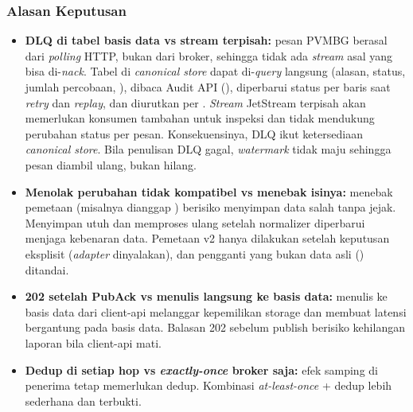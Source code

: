 \subsubsection{Alasan Keputusan}
\begin{itemize}
\item \textbf{DLQ di tabel basis data vs stream terpisah:} pesan PVMBG berasal dari \textit{polling} HTTP, bukan dari broker, sehingga tidak ada \textit{stream} asal yang bisa di-\textit{nack}. Tabel di \textit{canonical store} dapat di-\textit{query} langsung (alasan, status, jumlah percobaan, ), dibaca Audit API (), diperbarui status per baris saat \textit{retry} dan \textit{replay}, dan diurutkan per . \textit{Stream} JetStream terpisah akan memerlukan konsumen tambahan untuk inspeksi dan tidak mendukung perubahan status per pesan. Konsekuensinya, DLQ ikut ketersediaan \textit{canonical store}. Bila penulisan DLQ gagal, \textit{watermark} tidak maju sehingga pesan diambil ulang, bukan hilang.
\item \textbf{Menolak perubahan tidak kompatibel vs menebak isinya:} menebak pemetaan (misalnya  dianggap ) berisiko menyimpan data salah tanpa jejak. Menyimpan utuh dan memproses ulang setelah normalizer diperbarui menjaga kebenaran data. Pemetaan v2 hanya dilakukan setelah keputusan eksplisit (\textit{adapter} dinyalakan), dan pengganti yang bukan data asli () ditandai.
\item \textbf{202 setelah PubAck vs menulis langsung ke basis data:} menulis ke basis data dari client-api melanggar kepemilikan storage dan membuat latensi bergantung pada basis data. Balasan 202 sebelum publish berisiko kehilangan laporan bila client-api mati.
\item \textbf{Dedup di setiap hop vs \textit{exactly-once} broker saja:} efek samping di penerima tetap memerlukan dedup. Kombinasi \textit{at-least-once} + dedup lebih sederhana dan terbukti.
\end{itemize}

